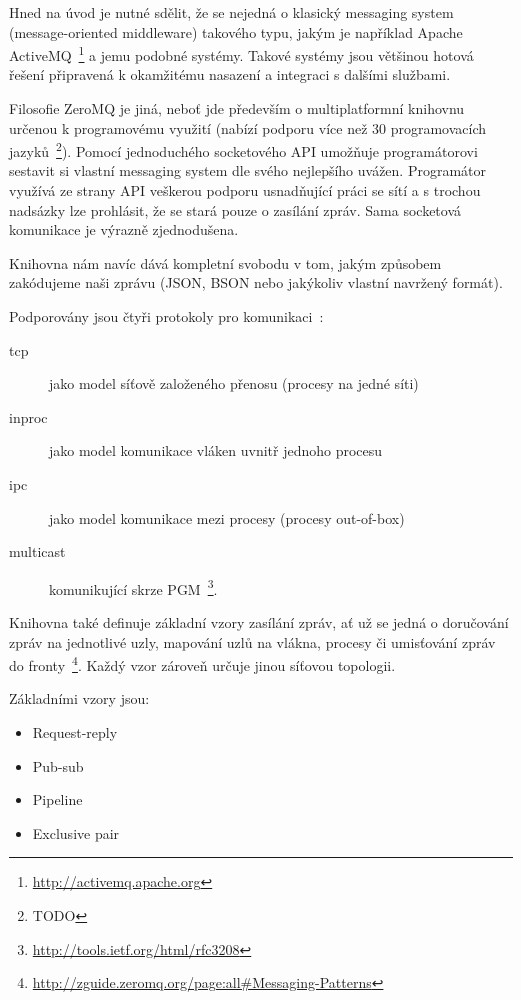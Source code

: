 \documentclass[thesis=M,czech]{FITthesis}[2014/05/07]
\begin{document}
Hned na úvod je nutné sdělit, že se nejedná o klasický messaging system (message-oriented middleware) takového typu, jakým je například Apache ActiveMQ~\footnote{\url{http://activemq.apache.org}} a jemu podobné systémy. Takové systémy jsou většinou hotová řešení připravená k okamžitému nasazení a integraci s dalšími službami. 

Filosofie ZeroMQ je jiná, neboť jde především o multiplatformní knihovnu určenou k programovému využití (nabízí podporu více než 30 programovacích jazyků~\footnote{TODO}). Pomocí jednoduchého socketového API umožňuje programátorovi sestavit si vlastní messaging system dle svého nejlepšího uvážen. Programátor využívá ze strany API veškerou podporu usnadňující práci se sítí a s trochou nadsázky lze prohlásit, že se stará pouze o zasílání zpráv. Sama socketová komunikace je výrazně zjednodušena.

Knihovna nám navíc dává kompletní svobodu v tom, jakým způsobem zakódujeme naši zprávu (JSON, BSON nebo jakýkoliv vlastní navržený formát).

Podporovány jsou čtyři protokoly pro komunikaci~\cite{zeromq1}:

\begin{description}
	\item[tcp] jako model síťově založeného přenosu (procesy na jedné síti)
	\item[inproc] jako model komunikace vláken uvnitř jednoho procesu
	\item[ipc] jako model komunikace mezi procesy (procesy out-of-box)
	\item[multicast]	komunikující skrze PGM~\footnote{\url{http://tools.ietf.org/html/rfc3208}}.
\end{description}

Knihovna také definuje základní vzory zasílání zpráv, ať už se jedná o doručování zpráv na jednotlivé uzly, mapování uzlů na vlákna, procesy či umisťování zpráv do fronty~\footnote{\url{http://zguide.zeromq.org/page:all\#Messaging-Patterns}}. Každý vzor zároveň určuje jinou síťovou topologii.

Základními vzory jsou:

\begin{itemize}
	\item Request-reply
	\item Pub-sub
	\item Pipeline		
	\item Exclusive pair
\end{itemize}
\end{document}
